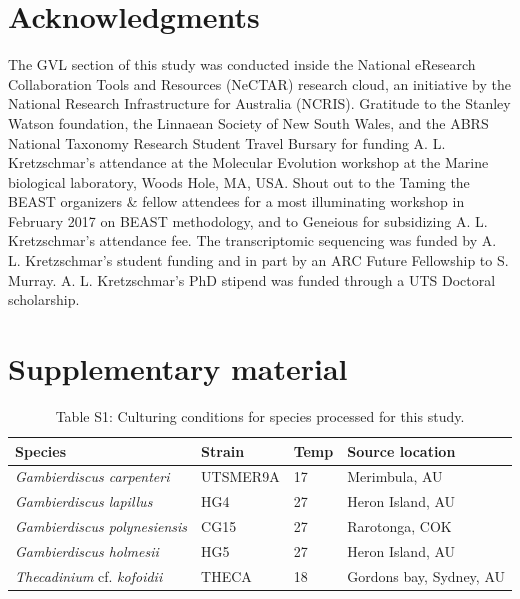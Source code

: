 \documentclass[fleqn,10pt,lineno]{wlpeerj} %
\begin{document}
\section*{Acknowledgments}

The GVL section of this study was conducted inside the National eResearch Collaboration Tools and Resources (NeCTAR) research cloud, an initiative by the National Research Infrastructure for Australia (NCRIS).
Gratitude to the Stanley Watson foundation, the Linnaean Society of New South Wales, and the ABRS National Taxonomy Research Student Travel Bursary for funding A. L. Kretzschmar's attendance at the Molecular Evolution workshop at the Marine biological laboratory, Woods Hole, MA, USA.
Shout out to the Taming the BEAST organizers \& fellow attendees for a most illuminating workshop in February 2017 on BEAST methodology, and to Geneious for subsidizing A. L. Kretzschmar's attendance fee.
The transcriptomic sequencing was funded by A. L. Kretzschmar's student funding and in part by an ARC Future Fellowship to S. Murray.
A. L. Kretzschmar's PhD stipend was funded through a UTS Doctoral scholarship.



\section*{Supplementary material}

\begin{table}
\caption*{Table S1: Culturing conditions for species processed for this study.}
\begin{tabular}{ | p{3cm} | p{2.5cm} | p{1.5cm} | p{5.3cm} |}
\hline
\textbf{Species} & \textbf{Strain}& \textbf{Temp} & \textbf{Source location} \\
\hline
\textit{Gambierdiscus carpenteri}&UTSMER9A&17&Merimbula, AU\\
\hline
\textit{Gambierdiscus lapillus}&HG4&27&Heron Island, AU\\
\hline
\textit{Gambierdiscus polynesiensis}&CG15&27&Rarotonga, COK\\
\hline
\emph{Gambierdiscus holmesii}&HG5&27&Heron Island, AU\\
\hline
\textit{Thecadinium} cf. \emph{kofoidii}&THECA&18&Gordons bay, Sydney, AU\\
\hline
\end{tabular}
\end{table}
\end{document}
